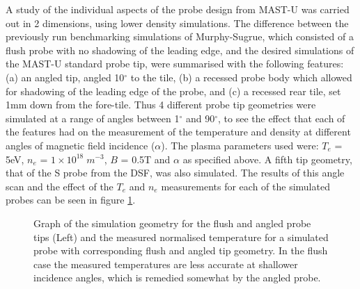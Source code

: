 \documentclass[a4paper, 12pt]{article} %
\begin{document}
	A study of the individual aspects of the probe design from MAST-U was carried out in 2 dimensions, using lower density simulations. 
	The difference between the previously run benchmarking simulations of Murphy-Sugrue, which consisted of a flush probe with no shadowing of the leading edge, and the desired simulations of the MAST-U standard probe tip, were summarised with the following features: (a) an angled tip, angled 10$^{\circ}$ to the tile, (b) a recessed probe body which allowed for shadowing of the leading edge of the probe, and (c) a recessed rear tile, set 1mm down from the fore-tile.  
	Thus 4 different probe tip geometries were simulated at a range of angles between 1$^{\circ}$ and 90$^{\circ}$, to see the effect that each of the features had on the measurement of the temperature and density at different angles of magnetic field incidence ($\alpha$).
	The plasma parameters used were: $T_e$ = 5eV, $n_e$ = $1 \times 10^{18} \; m^{-3}$, $B$ = 0.5T and $\alpha$ as specified above. 
	A fifth tip geometry, that of the S probe from the DSF, was also simulated. 
	The results of this angle scan and the effect of the $T_e$ and $n_e$ measurements for each of the simulated probes can be seen in figure \ref{fig:sim-incidence-angle}.
	\begin{figure}[!tb]
		\vspace{-0pt}
		\caption{
			Graph of the simulation geometry for the flush and angled probe tips (Left) and the measured normalised temperature for a simulated probe with corresponding flush and angled tip geometry. 
			In the flush case the measured temperatures are less accurate at shallower incidence angles, which is remedied somewhat by the angled probe.
			}
		\label{fig:sim-incidence-angle}
		\vspace{-10pt}
	\end{figure}
	
\end{document}
